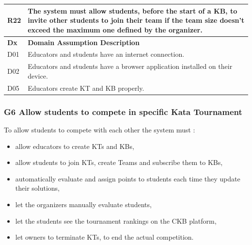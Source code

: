 \documentclass[11pt]{report}
\begin{document}
\begin{longtable}[h] {|p{10mm} p{130mm}|}
R22 & The system must allow students, before the start of a KB, to invite other students to join their team if the team size doesn't exceed the maximum one defined by the organizer. \\
\hline
\textbf{Dx} & \textbf{Domain Assumption Description} \\ \hline
D01 & Educators and students have an internet connection. \\ 
D02 & Educators and students have a browser application installed on their device.  \\ 
D05 & Educators create KT and KB properly.  \\ \hline
\end{longtable}

\subsubsection{G6 Allow students to compete in specific Kata Tournament}
To allow students to compete with each other the system must :

\begin{itemize}
    \item allow educators to create KTs and KBs,
    \item allow students to join KTs, create Teams and subscribe them to KBs,
    \item automatically evaluate and assign points to students each time they update their solutions,
    \item let the organizers manually evaluate students,
    \item let the students see the tournament rankings on the CKB platform,
    \item let owners to terminate KTs, to end the actual competition.
\end{itemize}
\end{document}

